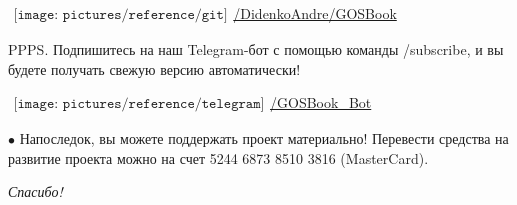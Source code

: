 \vspace*{0.1\baselineskip}
 
\noindent\href{https://github.com/DidenkoAndre/GOSBook}{$
	\begin{array}{l}
	\texttt{[image: pictures/reference/git]}
	\end{array}$/DidenkoAndre/GOSBook}

\vspace*{0.5\baselineskip} 

\noindent PPPS. Подпишитесь на наш Telegram-бот с помощью команды \textsf{/subscribe}, и вы будете получать свежую версию автоматически!

\vspace*{0.1\baselineskip} 

\noindent\href{https://t.me/GOSBook_Bot}{$
	\begin{array}{l}
	\texttt{[image: pictures/reference/telegram]}
	\end{array}$/GOSBook\_Bot}

\vspace*{0.5\baselineskip} 

\noindent $\bullet$ Напоследок, вы можете поддержать проект материально! Перевести средства на развитие проекта можно на счет {\large 5244 6873 8510 3816} \textsf{(MasterCard)}.

\vspace*{0.5\baselineskip} 

\textit{Спасибо!}
